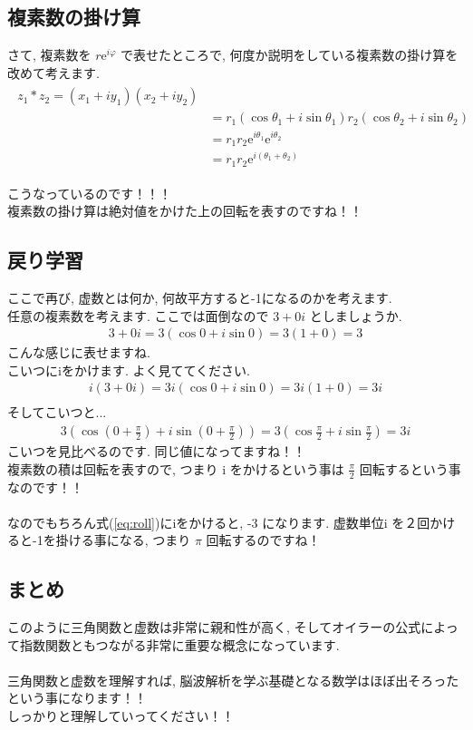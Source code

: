 \documentclass[11pt,a4paper]{jreport}
\begin{document}
\subsection{複素数の掛け算}
さて, 複素数を $r\mathrm{e}^{i\varphi}$ で表せたところで, 何度か説明をしている複素数の掛け算を改めて考えます.\\
\begin{eqnarray}
\begin{split}
z_1 * z_2 = (x_1 + iy_1)(x_2 + iy_2)\\
&= r_1(\cos\theta_1 + i\sin\theta_1)r_2(\cos\theta_2 + i\sin\theta_2)\\
&= r_1r_2\mathrm{e}^{i\theta_1} \mathrm{e}^{i\theta_2}\\
&= r_1r_2\mathrm{e}^{i(\theta_1 + \theta_2)}
\end{split}
\end{eqnarray}

こうなっているのです！！！\\
複素数の掛け算は絶対値をかけた上の回転を表すのですね！！
\subsection{戻り学習}
ここで再び, 虚数とは何か, 何故平方すると-1になるのかを考えます.\\
任意の複素数を考えます. ここでは面倒なので $ 3 + 0i$ としましょうか.
\begin{eqnarray}
3 + 0i = 3(\cos 0 + i\sin 0) = 3(1 + 0) = 3
\end{eqnarray}
こんな感じに表せますね.\\
こいつにiをかけます. よく見ててください.
\begin{eqnarray}
i(3 + 0i) = 3i(\cos 0 + i\sin 0) = 3i(1+0) = 3i\\
\end{eqnarray}
そしてこいつと...
\begin{eqnarray}
3(\cos (0+\frac{\pi}{2}) + i\sin (0 + \frac{\pi}{2})) = 3(\cos\frac{\pi}{2} + i\sin\frac{\pi}{2}) = 3i
\label{eq:roll}
\end{eqnarray}
こいつを見比べるのです. 同じ値になってますね！！\\
複素数の積は回転を表すので, つまり i をかけるという事は $\frac{\pi}{2}$ 回転するという事なのです！！\\
\\
なのでもちろん式(\ref{eq:roll})にiをかけると, -3 になります. 虚数単位i を２回かけると-1を掛ける事になる, つまり $\pi$ 回転するのですね！\\
\subsection{まとめ}
このように三角関数と虚数は非常に親和性が高く, そしてオイラーの公式によって指数関数ともつながる非常に重要な概念になっています. \\
\\
三角関数と虚数を理解すれば, 脳波解析を学ぶ基礎となる数学はほぼ出そろったという事になります！！\\
しっかりと理解していってください！！\\
\end{document}

